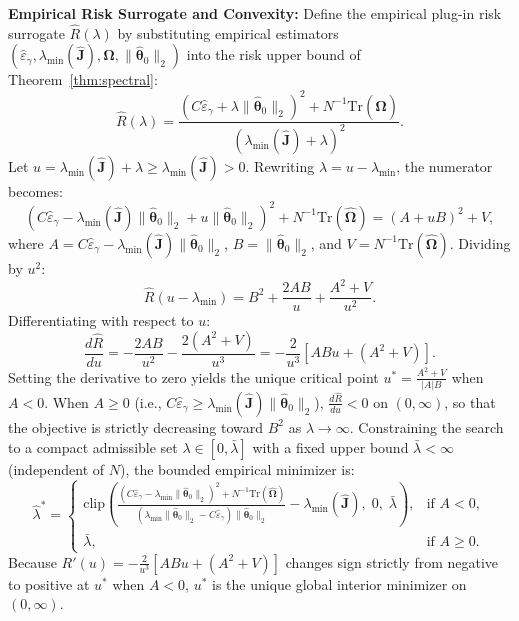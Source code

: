\textbf{Empirical Risk Surrogate and Convexity:}
Define the empirical plug-in risk surrogate $\hat{R}(\lambda)$ by substituting empirical estimators $(\hat{\varepsilon}_\gamma, \lambda_{\min}(\hat{\boldsymbol{J}}), \hat{\boldsymbol{\Omega}}, \|\hat{\boldsymbol{\theta}}_0\|_2)$ into the risk upper bound of Theorem~\ref{thm:spectral}:
\begin{equation}
    \hat{R}(\lambda) = \frac{(C \hat{\varepsilon}_\gamma + \lambda \|\hat{\boldsymbol{\theta}}_0\|_2)^2 + N^{-1}\mathrm{Tr}(\hat{\boldsymbol{\Omega}})}{(\lambda_{\min}(\hat{\boldsymbol{J}}) + \lambda)^2}.
\end{equation}
Let $u = \lambda_{\min}(\hat{\boldsymbol{J}}) + \lambda \ge \lambda_{\min}(\hat{\boldsymbol{J}}) > 0$. Rewriting $\lambda = u - \lambda_{\min}$, the numerator becomes:
\begin{equation}
    \left( C \hat{\varepsilon}_\gamma - \lambda_{\min}(\hat{\boldsymbol{J}}) \|\hat{\boldsymbol{\theta}}_0\|_2 + u \|\hat{\boldsymbol{\theta}}_0\|_2 \right)^2 + N^{-1}\mathrm{Tr}(\hat{\boldsymbol{\Omega}}) = (A + u B)^2 + V,
\end{equation}
where $A = C \hat{\varepsilon}_\gamma - \lambda_{\min}(\hat{\boldsymbol{J}}) \|\hat{\boldsymbol{\theta}}_0\|_2$, $B = \|\hat{\boldsymbol{\theta}}_0\|_2$, and $V = N^{-1}\mathrm{Tr}(\hat{\boldsymbol{\Omega}})$.
Dividing by $u^2$:
\begin{equation}
    \hat{R}(u - \lambda_{\min}) = B^2 + \frac{2AB}{u} + \frac{A^2 + V}{u^2}.
\end{equation}
Differentiating with respect to $u$:
\begin{equation}
    \frac{d \hat{R}}{du} = -\frac{2AB}{u^2} - \frac{2(A^2 + V)}{u^3} = -\frac{2}{u^3} \left[ AB u + (A^2 + V) \right].
\end{equation}
Setting the derivative to zero yields the unique critical point $u^* = \frac{A^2 + V}{|A| B}$ when $A < 0$. When $A \ge 0$ (i.e., $C \hat{\varepsilon}_\gamma \ge \lambda_{\min}(\hat{\boldsymbol{J}}) \|\hat{\boldsymbol{\theta}}_0\|_2$), $\frac{d\hat{R}}{du} < 0$ on $(0, \infty)$, so that the objective is strictly decreasing toward $B^2$ as $\lambda \to \infty$. Constraining the search to a compact admissible set $\lambda \in [0, \bar{\lambda}]$ with a fixed upper bound $\bar{\lambda} < \infty$ (independent of $N$), the bounded empirical minimizer is:
\begin{equation}
    \hat{\lambda}^* = \begin{cases} 
    \mathrm{clip}\left( \frac{(C\hat{\varepsilon}_\gamma - \lambda_{\min}\|\hat{\boldsymbol{\theta}}_0\|_2)^2 + N^{-1}\mathrm{Tr}(\hat{\boldsymbol{\Omega}})}{(\lambda_{\min}\|\hat{\boldsymbol{\theta}}_0\|_2 - C\hat{\varepsilon}_\gamma)\|\hat{\boldsymbol{\theta}}_0\|_2} - \lambda_{\min}(\hat{\boldsymbol{J}}), \; 0, \; \bar{\lambda} \right), & \text{if } A < 0, \\
    \bar{\lambda}, & \text{if } A \ge 0.
    \end{cases}
\end{equation}
Because $R'(u) = -\frac{2}{u^3}[AB u + (A^2+V)]$ changes sign strictly from negative to positive at $u^*$ when $A < 0$, $u^*$ is the unique global interior minimizer on $(0, \infty)$.

